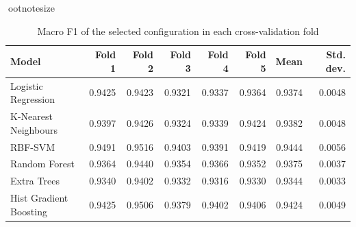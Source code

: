 \begin{table}[htbp]
\centering
ootnotesize
\caption{Macro F1 of the selected configuration in each cross-validation fold}
\label{tab:cv_folds}
\begin{tabular}{lrrrrrrr}
\toprule
Model & Fold 1 & Fold 2 & Fold 3 & Fold 4 & Fold 5 & Mean & Std. dev. \\
\midrule
Logistic Regression & 0.9425 & 0.9423 & 0.9321 & 0.9337 & 0.9364 & 0.9374 & 0.0048 \\
K-Nearest Neighbours & 0.9397 & 0.9426 & 0.9324 & 0.9339 & 0.9424 & 0.9382 & 0.0048 \\
RBF-SVM & 0.9491 & 0.9516 & 0.9403 & 0.9391 & 0.9419 & 0.9444 & 0.0056 \\
Random Forest & 0.9364 & 0.9440 & 0.9354 & 0.9366 & 0.9352 & 0.9375 & 0.0037 \\
Extra Trees & 0.9340 & 0.9402 & 0.9332 & 0.9316 & 0.9330 & 0.9344 & 0.0033 \\
Hist Gradient Boosting & 0.9425 & 0.9506 & 0.9379 & 0.9402 & 0.9406 & 0.9424 & 0.0049 \\
\bottomrule
\end{tabular}
\end{table}
